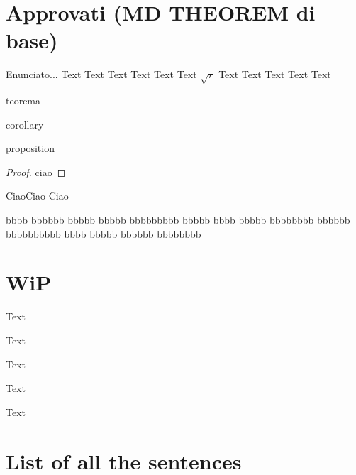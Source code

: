 \documentclass[a4paper,12pt]{report}
\begin{document}
\section{Approvati (MD THEOREM di base)}
\lipsum[1]

\begin{lemma}[di coso]
	Enunciato...
Text Text Text Text Text Text $\sqrt{r}$ Text Text Text Text Text



\end{lemma}%

\begin{theorem}%
teorema
\end{theorem}%

\begin{corollary}%
corollary
\end{corollary}%

\begin{proposition}%
proposition
\end{proposition}%

\begin{proof}
ciao
\end{proof}
\proof
CiaoCiao
Ciao
\lipsum[3]
\endproof



\begin{definition}[Bu]
bbbb bbbbbb bbbbb bbbbb bbbbbbbbb bbbbb bbbb bbbbb bbbbbbbb bbbbbb bbbbbbbbbb bbbb bbbbb bbbbbb 
bbbbbbbb
\end{definition}


\section{WiP}

\begin{notationfix}
Text
\end{notationfix}

\begin{TAM}
Text
\end{TAM}

\begin{example}
Text
\end{example}

\begin{observation}
Text
\end{observation}

\begin{remark}
Text
\end{remark}


\section{List of all the sentences}
\end{document}
